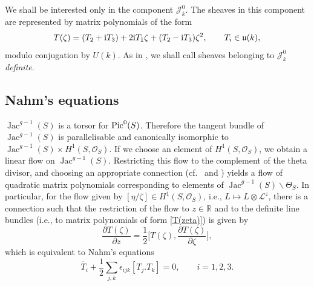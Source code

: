 \documentclass[pdftex]{sigma}
\renewcommand{\u}{{\mathfrak u}}
\newcommand{\Jac}{\operatorname{Jac}}
\numberwithin{equation}{section}
\newcommand{\oR}{{\mathbb{R}}}
\newcommand{\sO}{{\mathcal{O}}}
\begin{document}
We shall be interested only in the component $\mathscr{J}_k^0$. The sheaves in this component are represented by matrix polynomials of the form
\begin{equation}
T(\zeta)=(T_2+{\rm i} T_3)+2{\rm i} T_1\zeta+(T_2-{\rm i} T_3)\zeta^2,\qquad T_i\in\u(k),\label{T(zeta)}
\end{equation}
modulo conjugation by $U(k)$.
As in \cite{theta}, we shall call sheaves belonging to $\mathscr{J}_k^0$ {\em definite}.

\subsection{Nahm's equations}
$\Jac^{g-1}(S)$ is a torsor for ${\rm Pic}^0(S)$. Therefore the tangent bundle of $\Jac^{g-1}(S)$ is parallelisable and canonically isomorphic to $ \Jac^{g-1}(S)\times H^1(S,\sO_S)$. If we choose an element of $ H^1(S,\sO_S)$, we obtain a linear flow on $\Jac^{g-1}(S)$. Restricting this flow to the complement of the theta divisor, and choosing an appropriate connection (cf.\ \cite{Hit} and \cite{AHH}) yields a flow of quadratic matrix polynomials corresponding to elements of $\Jac^{g-1}(S)\backslash \Theta_S$. In particular, for the flow given by $[\eta/\zeta]\in H^1(S,\sO_S)$, i.e., $L\mapsto L\otimes \mathscr{L}^z$, there is a connection such that the restriction of the flow to $z\in \oR$ and to the definite line bundles
(i.e., to matrix polynomials of form \eqref{T(zeta)}) is given by
\begin{equation*}
\frac{\partial T(\zeta)}{\partial z}=\frac{1}{2}\bigg[T(\zeta),\frac{\partial T(\zeta)}{\partial \zeta}\bigg],%
\end{equation*}
which is equivalent to Nahm's equations
\begin{equation}\label{eq:Nahm}
\dot{T_i}+\frac{1}{2}\sum_{j,k}\epsilon_{ijk}[T_j.T_k]=0,\qquad
i=1,2,3.
\end{equation}
\end{document}
